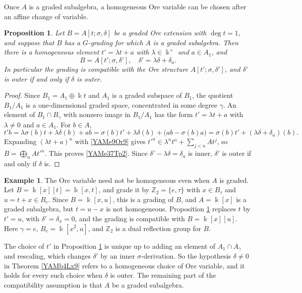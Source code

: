 \documentclass[reqno]{amsart}
\numberwithin{equation}{section}
\newtheorem{proposition}[equation]{Proposition}
\theoremstyle{definition}
\newtheorem{example}[equation]{Example}
\theoremstyle{remark}
\theoremstyle{plain}
\newcommand{\kk}{\Bbbk}
\begin{document}
Once $A$ is a graded subalgebra, a homogeneous Ore variable can be chosen after an affine change of variable.

\begin{proposition}\label{YAMu9Cj4}
Let $B=A[t;\sigma,\delta]$ be a graded Ore extension with $\deg t=1$, and suppose that $B$ has a $G$-grading for which $A$ is a graded subalgebra. Then there is a homogeneous element $t'=\lambda t+a$ with $\lambda\in\kk^\times$ and $a\in A_1$, and
\begin{equation}\label{YAMe37Tp2}
B=A[t';\sigma,\delta'],\quad\delta'=\lambda\delta+\delta_a.
\end{equation}
In particular the grading is compatible with the Ore structure $A[t';\sigma,\delta']$, and $\delta'$ is outer if and only if $\delta$ is outer.
\end{proposition}

\begin{proof}
Since $B_1=A_1\oplus\kk t$ and $A_1$ is a graded subspace of $B_1$, the quotient $B_1/A_1$ is a one-dimensional graded space, concentrated in some degree $\gamma$. An element of $B_1\cap B_\gamma$ with nonzero image in $B_1/A_1$ has the form $t'=\lambda t+a$ with $\lambda\neq0$ and $a\in A_1$. For $b\in A$,
\[
t'b=\lambda\sigma(b)t+\lambda\delta(b)+ab=\sigma(b)t'+\lambda\delta(b)+\big(ab-\sigma(b)a\big)=\sigma(b)t'+(\lambda\delta+\delta_a)(b).
\]
Expanding $(\lambda t+a)^n$ with \eqref{YAMe9Or9} gives $t'^n\in\lambda^nt^n+\sum_{j<n}At^j$, so $B=\bigoplus_nAt'^n$. This proves \eqref{YAMe37Tp2}. Since $\delta'-\lambda\delta=\delta_a$ is inner, $\delta'$ is outer if and only if $\delta$ is.
\end{proof}

\begin{example}\label{YAMex18Af2}
The Ore variable need not be homogeneous even when $A$ is graded. Let $B=\kk[x][t]=\kk[x,t]$, and grade it by $\mathbb Z_2=\{e,\tau\}$ with $x\in B_\tau$ and $u=t+x\in B_e$. Since $B=\kk[x,u]$, this is a grading of $B$, and $A=\kk[x]$ is a graded subalgebra, but $t=u-x$ is not homogeneous. Proposition \ref{YAMu9Cj4} replaces $t$ by $t'=u$, with $\delta'=\delta_x=0$, and the grading is compatible with $B=\kk[x][u]$. Here $\gamma=e$, $B_e=\kk[x^2,u]$, and $\mathbb Z_2$ is a dual reflection group for $B$.
\end{example}

The choice of $t'$ in Proposition \ref{YAMu9Cj4} is unique up to adding an element of $A_1\cap A_\gamma$ and rescaling, which changes $\delta'$ by an inner $\sigma$-derivation. So the hypothesis $\delta\neq0$ in Theorem \ref{YAMb4Lx9} refers to a homogeneous choice of Ore variable, and it holds for every such choice when $\delta$ is outer. The remaining part of the compatibility assumption is that $A$ be a graded subalgebra.
\end{document}
